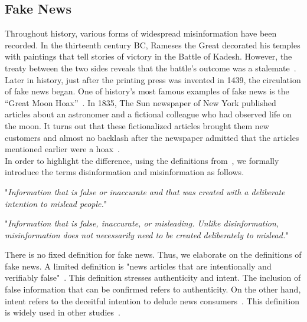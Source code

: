 \subsection{Fake News}
\label{subsec:fakeNewsDetection_fakeNews}
Throughout history, various forms of widespread misinformation have been recorded. In the thirteenth
century BC, Rameses the Great decorated his temples with paintings that tell stories of victory in the Battle
of Kadesh. However, the treaty between the two sides reveals that the battle's outcome was a stalemate~\parencite{HistorysGreatestLies_Weir}. Later in history, just after the printing press was invented in 1439, the circulation of fake news began. One of history's most famous examples of fake news is the “Great Moon Hoax”~\parencite{TheGreatMoonHoax_Foster}. In 1835, The Sun newspaper of New York published articles about an astronomer and a fictional colleague who had observed life on the moon. It turns out that these fictionalized articles brought them new customers and almost no backlash after the newspaper admitted that the articles mentioned earlier were a hoax~\parencite{TheLongAndBrutalHistoryOfFakeNews_Soll}.\\
In order to highlight the difference, using the definitions from~\parencite{ThePsycologyOfFakeNews_Pennycook}, we formally introduce the terms disinformation and misinformation as follows.
\begin{definition}
    "\emph{Information that is false or inaccurate and that was created with a deliberate intention to mislead people.}"~\parencite{ThePsycologyOfFakeNews_Pennycook}
\end{definition}
\begin{definition}
    "\emph{Information that is false, inaccurate, or misleading. Unlike disinformation, misinformation does not necessarily need to be created deliberately to mislead.}"~\parencite{ThePsycologyOfFakeNews_Pennycook}
\end{definition}
There is no fixed definition for fake news. Thus, we elaborate on the definitions of fake news. A limited definition is "news articles that are intentionally and verifiably false"~\parencite{SocialMediaAndFakeNewsIn2016Election_Allcott}. This definition stresses authenticity and intent. The inclusion of false information that can be confirmed refers to authenticity. On the other hand, intent refers to the deceitful intention to delude news consumers~\parencite{FakeNewsDetectionOnSocialMediaADataMiningPerspective_Shu}. This definition is widely used in other studies~\parencite{AutomaticDeceptionDetection_Conroy, TheFakeNewsSpreadingPlague_Mustafaraj, FakeNewsDetectionOnSocialMediaADataMiningPerspective_Shu}.\\

